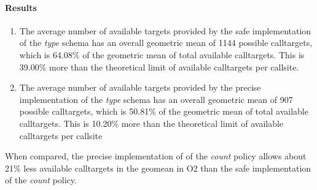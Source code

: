\paragraph{Results}
\begin{enumerate}
\item The average number of available targets provided by the safe implementation of the \textit{type} schema has an overall geometric mean of  1144 possible calltargets, which is 64.08\% of the geometric mean of total available calltargets. This is 39.00\% more than the theoretical limit of available calltargets per callsite.
\item The average number of available targets provided by the precise implementation of the \textit{type} schema has an overall geometric mean of  907 possible calltargets, which is 50.81\% of the geometric mean of total available calltargets. This is 10.20\% more than the theoretical limit of available calltargets per callsite
\end{enumerate}

When compared, the precise implementation of of the \textit{count} policy allows about 21\% less available calltargets in the geomean in O2 than the safe implementation of the \textit{count} policy.


